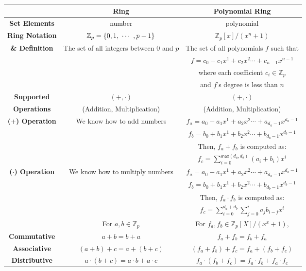 \begin{table}[h]
\centering
\footnotesize
\begin{tabular}{|c||c|c|} %
\hline
&\textbf{Ring} & \textbf {Polynomial Ring} \\
\hline
\hline
\textbf{{Set Elements}} & number & polynomial \\
\hline
\textbf{{Ring Notation}} & $\mathbb{Z}_p = \{0, 1, \text{ } \text{$\cdots$} \text{ }, p - 1\}$  & $\mathbb{Z}_p[x] / (x^n + 1)$ \\
\textbf{{\& Definition}} & The set of all integers between $0$ and $p$ & The set of all polynomials $f$ such that\\
&& $f= c_0 + c_1x^1 + c_2x^2 \cdots + c_{n-1}x^{n-1}$ \\
&& where each coefficient $c_i \in \mathbb{Z}_p$ \\
&& and $f$'s degree is less than $n$ \\
\hline
\textbf{{Supported}}&$(+, \cdot)$& $(+, \cdot)$ \\
\textbf{{Operations}}&(Addition, Multiplication)& (Addition, Multiplication) \\
\hline
\textbf{{($+$) Operation}} & We know how to add numbers & $f_a = a_0 + a_1x^1 + a_2x^2 \cdots + a_{d_a-1}x^{d_a-1}$ \\
 & & $f_b = b_0 + b_1x^1 + b_2x^2 \cdots + b_{d_b-1}x^{d_b-1}$ \\
 & & Then, $f_a + f_b$ is computed as: \\
 & & $f_c = \sum\limits_{i=0}^{\textsf{max}(d_a,d_b)}(a_i+b_i)x^i$ \\
\hline
\textbf{{($\cdot$) Operation}} & We know how to multiply numbers & $f_a = a_0 + a_1x^1 + a_2x^2 \cdots + a_{d_a-1}x^{d_a-1}$ \\
 & & $f_b = b_0 + b_1x^1 + b_2x^2 \cdots + b_{d_b-1}x^{d_b-1}$ \\
 & & Then, $f_a \cdot f_b$ is computed as: \\
 & & $f_c = \sum\limits_{i=0}^{d_a+d_b}\sum\limits_{j=0}^{i}a_jb_{i-j}x^i$ \\
\hline
& For $a, b \in \mathbb{Z}_p$ & For $f_a, f_b \in \mathbb{Z}_p[X]/(x^x + 1)$,\\
\textbf{{Commutative}}  & $ a + b = b + a$ & $f_a + f_b = f_b + f_a$\\
\textbf{{Associative}} & $(a + b) + c = a + (b + c)$ & $(f_a + f_b) + f_c = f_a + (f_b + f_c)$\\
\textbf{{Distributive}} & $a \cdot (b + c) = a\cdot b + a\cdot c$ & $f_a \cdot (f_b + f_c) = f_a\cdot f_b + f_a\cdot f_c$\\

\end{tabular}
\end{table}
